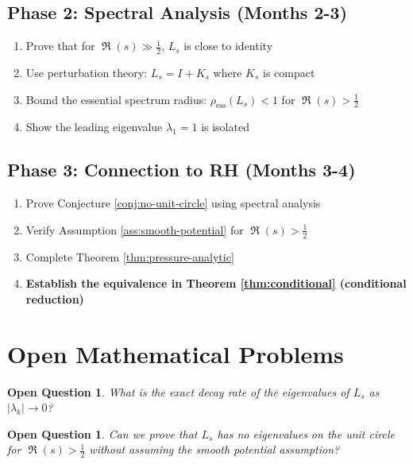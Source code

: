 \documentclass[11pt,a4paper]{article}
\newtheorem{question}[theorem]{Open Question}
\theoremstyle{definition}
\DeclareMathOperator{\Ree}{\Re}
\newcommand{\half}{\frac{1}{2}}
\newcommand{\la}{\lambda}
\begin{document}
\subsection{Phase 2: Spectral Analysis (Months 2-3)}
\label{sec:phase2}

\begin{enumerate}
\item Prove that for $\Ree(s) \gg \half$, $L_s$ is close to identity
\item Use perturbation theory: $L_s = I + K_s$ where $K_s$ is compact
\item Bound the essential spectrum radius: $\rho_{\text{ess}}(L_s) < 1$ for $\Ree(s) > \half$
\item Show the leading eigenvalue $\la_1 = 1$ is isolated
\end{enumerate}

\subsection{Phase 3: Connection to RH (Months 3-4)}
\label{sec:phase3}

\begin{enumerate}
\item Prove Conjecture \ref{conj:no-unit-circle} using spectral analysis
\item Verify Assumption \ref{ass:smooth-potential} for $\Ree(s) > \half$
\item Complete Theorem \ref{thm:pressure-analytic}
\item {\bf Establish the equivalence in Theorem \ref{thm:conditional} (conditional reduction)}
\end{enumerate}

\section{Open Mathematical Problems}
\label{sec:open-problems}

\begin{question}
What is the exact decay rate of the eigenvalues of $L_s$ as $|\la_k| \to 0$?
\end{question}

\begin{question}
Can we prove that $L_s$ has no eigenvalues on the unit circle for $\Ree(s) > \half$ without assuming the smooth potential assumption?
\end{question}
\end{document}
